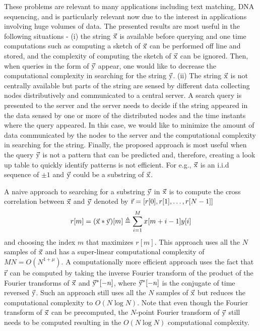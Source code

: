 These problems are relevant to many applications including text matching, DNA sequencing, and is particularly relevant now due to the interest in applications involving huge volumes of data. The presented results are most useful in the following situations - (i) the string $\vec{\mathrm{x}}$ is available before querying and one time computations such as computing a sketch of $\vec{\mathrm{x}}$ can be performed off line and stored, and the complexity of computing the sketch of $\vec{\mathrm{x}}$ can be ignored. Then, when queries in the form of $\vec{\mathrm{y}}$ appear, one would like to decrease the computational complexity in searching for the string $\vec{\mathrm{y}}$. (ii) The string $\vec{\mathrm{x}}$ is not centrally available but parts of the string are sensed by different data collecting nodes distributively and communicated to a central server. A search query is presented to the server and the server needs to decide if the string appeared in the data sensed by one or more of the distributed nodes and the time instants where the query appeared. In this case, we would like to minimize the amount of data communicated by the nodes to the server and the computational complexity in searching for the string. Finally, the proposed approach is most useful when the query $\vec{\mathrm{y}}$ is not a pattern that can be predicted and, therefore, creating a look up table to quickly identify patterns is not efficient. For e.g., $\vec{\mathrm{x}}$ is an i.i.d sequence of $\pm 1$ and $\vec{\mathrm{y}}$ could be a substring of $\vec{\mathrm{x}}$.

A naive approach to searching for a substring $\vec{\mathrm{y}}$ in $\vec{\mathrm{x}}$ is to compute the cross correlation between $\vec{\mathrm{x}}$ and $\vec{\mathrm{y}}$ denoted by  $\vec{\mathrm{r}}=[r[0], r[1],\ldots, r[N-1]]$
\begin{align}
\label{Eqn:DefCrossCorrelation}
r[m]=(\vec{\mathrm{x}}*\vec{\mathrm{y}})[m] \triangleq \sum_{i=1}^{M} x[m+i-1] y[i]
\end{align}
and choosing the index $m$ that maximizes $r[m]$. This approach uses all the $N$ samples of $\vec{\mathrm{x}}$ and has a super-linear computational complexity of $MN = O(N^{1+\mu})$. A computationally more efficient approach uses the fact that $\vec{\mathrm{r}}$ can be computed by taking the inverse Fourier transform of the product of the Fourier transforms of $\vec{\mathrm{x}}$ and $ \vec{\mathrm{y}}^*[-n]$, where $\vec{\mathrm{y}}^*[-n]$ is the conjugate of time reversed $\vec{\mathrm{y}}$. Such an approach still uses all the $N$ samples of $\vec{\mathrm{x}}$ but reduces the computational complexity to $O(N \log N)$. Note that even though the Fourier transform of $\vec{\mathrm{x}}$ can be precomputed, the $N$-point Fourier transform of $\vec{\mathrm{y}}$ still needs to be computed resulting in the $O(N \log N)$ computational complexity.

